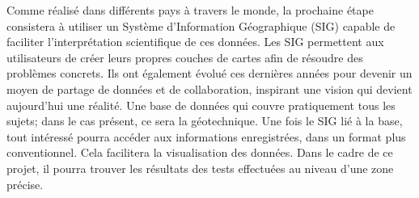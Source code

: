 \par
Comme réalisé dans différents pays à travers le monde, la prochaine 
étape consistera à utiliser un Système d'Information Géographique (SIG) 
capable de faciliter l'interprétation scientifique de ces données. 
Les SIG permettent aux utilisateurs de créer leurs propres couches de cartes 
afin de résoudre des problèmes concrets. Ils ont également évolué ces dernières années pour 
devenir un moyen de partage de données et de collaboration, inspirant une 
vision qui devient aujourd’hui une réalité. Une base de données qui 
couvre pratiquement tous les sujets; dans le cas présent, ce sera la géotechnique. 
Une fois le SIG lié à la base, tout intéressé pourra accéder aux informations 
enregistrées, dans un format plus conventionnel. Cela facilitera la visualisation des données. 
Dans le cadre de ce projet, il 
pourra trouver les résultats des tests effectuées au niveau d'une zone précise.